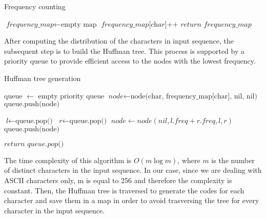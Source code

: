 \documentclass{report}
\begin{document}
\begin{algorithm}
    \caption{Frequency counting}
    \begin{algorithmic}[1]
        \State $\textit{frequency\_map} \gets \text{empty map}$
        \State $\textit{frequency\_map[char]++}$
        \EndFor
        \State $ \textit{return frequency\_map}$
        \EndProcedure
    \end{algorithmic}
\end{algorithm}
After computing the distribution of the characters in input sequence,
the subsequent step is to build the Huffman tree.
This process is supported by a priority queue to provide
efficient access to the nodes with the lowest frequency.
\begin{algorithm}
    \caption{Huffman tree generation}
    \begin{algorithmic}[1]
        \State queue $\gets$ empty priority queue
        \State $\textit{node} \gets \text{node(char, frequency\_map[char], nil, nil)}$
        \State $\text{queue.push(node)}$
        \EndFor

        \State $\textit{l} \gets \text{queue.pop()}$
        \State $\textit{r} \gets \text{queue.pop()}$
        \State $\textit{node} \gets node(nil, l.freq + r.freq, l, r)$
        \State $\text{queue.push(node)}$
        \EndWhile

        \State $ \textit{return queue.pop()}$

        \EndProcedure
    \end{algorithmic}
\end{algorithm}
The time complexity of this algorithm is $O(m \log m)$,
where $m$ is the number of distinct characters in the input sequence.
In our case, since we are dealing with ASCII characters only,
m is equal to 256 and therefore the complexity is constant.
Then, the Huffman tree is traversed to generate the codes for each character
and save them in a map in order to avoid trasversing the tree for
every character in the input sequence.
\end{document}
